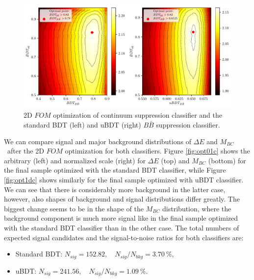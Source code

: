 \documentclass[headings=standardclasses,headings=big,oneside,a4paper,openany,12pt]{scrbook}
\newcommand {\vars}{$\Delta E$ and $M_{BC}$}
\begin{document}
\begin{figure}[H]
\centering
\captionsetup{width=0.8\linewidth}
\includegraphics[width=\linewidth]{fig/mva_fom}
\caption{2D $FOM$ optimization of continuum suppression classifier and the standard BDT (left) and uBDT (right) $B\bar B$ suppression classifier.}
\label{fig:mvafom}
\end{figure}

We can compare signal and major background distributions of \vars~after the 2D $FOM$ optimization for both classifiers. Figure \ref{fig:opt01c} shows the arbitrary (left) and normalized scale (right) for $\Delta E$ (top) and $M_{BC}$ (bottom) for the final sample optimized with the standard BDT classifier, while Figure \ref{fig:opt1dc} shows similarly for the final sample optimized with uBDT classifier. We can see that there is considerably more background in the latter case, however, also shapes of background and signal distributions differ greatly. The biggest change seems to be in the shape of the $M_{BC}$ distribution, where the background component is much more signal like in the final sample optimized with the standard BDT classifier than in the other case. The total numbers of expected signal candidates and the signal-to-noise ratios for both classifiers are:
\begin{itemize}
\item Standard BDT: $N_{sig} = 152.82,\quad N_{sig}/N_{bkg} = 3.70~\%$,
\item uBDT: $N_{sig} = 241.56,\quad N_{sig}/N_{bkg} = 1.09~\%$.
\end{itemize}
\end{document}
